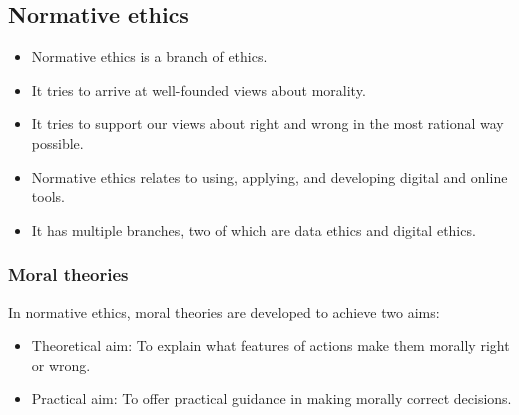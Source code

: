 \documentclass[11pt]{article}
\begin{document}
\subsection{Normative ethics}
\label{sec:org0bb4a5c}
\begin{itemize}
\item Normative ethics is a branch of ethics.
\item It tries to arrive at well-founded views about morality.
\item It tries to support our views about right and wrong in the most rational way possible.
\item Normative ethics relates to using, applying, and developing digital and online tools.
\item It has multiple branches, two of which are data ethics and digital ethics.
\end{itemize}
\subsubsection{Moral theories}
\label{sec:org586bf57}
In normative ethics, moral theories are developed to achieve two aims:
\begin{itemize}
\item Theoretical aim: To explain what features of actions make them morally right or wrong.
\item Practical aim: To offer practical guidance in making morally correct decisions.
\end{itemize}
\end{document}
